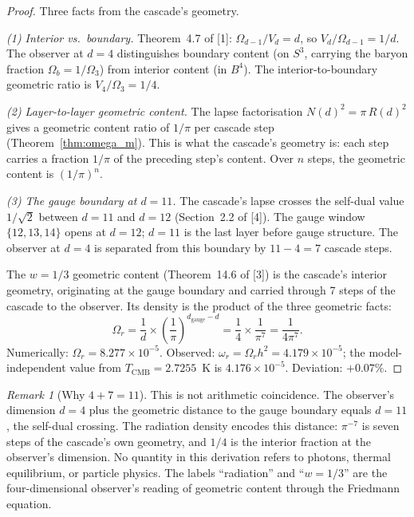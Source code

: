 \documentclass[12pt,a4paper]{article}
\theoremstyle{remark}
\newtheorem*{remark}{Remark}
\begin{document}
\begin{proof}
Three facts from the cascade's geometry.

\emph{(1) Interior vs.\ boundary.} Theorem~4.7 of [1]: $\Omega_{d-1}/V_d = d$, so $V_d/\Omega_{d-1} = 1/d$. The observer at $d = 4$ distinguishes boundary content (on $S^3$, carrying the baryon fraction $\Omega_b = 1/\Omega_3$) from interior content (in $B^4$). The interior-to-boundary geometric ratio is $V_4/\Omega_3 = 1/4$.

\emph{(2) Layer-to-layer geometric content.} The lapse factorisation $N(d)^2 = \pi\, R(d)^2$ gives a geometric content ratio of $1/\pi$ per cascade step (Theorem~\ref{thm:omega_m}). This is what the cascade's geometry is: each step carries a fraction $1/\pi$ of the preceding step's content. Over $n$ steps, the geometric content is $(1/\pi)^n$.

\emph{(3) The gauge boundary at $d = 11$.} The cascade's lapse crosses the self-dual value $1/\sqrt{2}$ between $d = 11$ and $d = 12$ (Section~2.2 of [4]). The gauge window $\{12, 13, 14\}$ opens at $d = 12$; $d = 11$ is the last layer before gauge structure. The observer at $d = 4$ is separated from this boundary by $11 - 4 = 7$ cascade steps.

The $w = 1/3$ geometric content (Theorem~14.6 of [3]) is the cascade's interior geometry, originating at the gauge boundary and carried through 7 steps of the cascade to the observer. Its density is the product of the three geometric facts:
\[
\Omega_r = \frac{1}{d} \times \left(\frac{1}{\pi}\right)^{d_{\mathrm{gauge}} - d} = \frac{1}{4} \times \frac{1}{\pi^7} = \frac{1}{4\pi^7}.
\]
Numerically: $\Omega_r = 8.277 \times 10^{-5}$. Observed: $\omega_r = \Omega_r h^2 = 4.179 \times 10^{-5}$; the model-independent value from $T_{\mathrm{CMB}} = 2.7255$~K is $4.176 \times 10^{-5}$. Deviation: $+0.07\%$.
\end{proof}

\begin{remark}[Why $4 + 7 = 11$]
This is not arithmetic coincidence. The observer's dimension $d = 4$ plus the geometric distance to the gauge boundary equals $d = 11$, the self-dual crossing. The radiation density encodes this distance: $\pi^{-7}$ is seven steps of the cascade's own geometry, and $1/4$ is the interior fraction at the observer's dimension. No quantity in this derivation refers to photons, thermal equilibrium, or particle physics. The labels ``radiation'' and ``$w = 1/3$'' are the four-dimensional observer's reading of geometric content through the Friedmann equation.
\end{remark}
\end{document}
